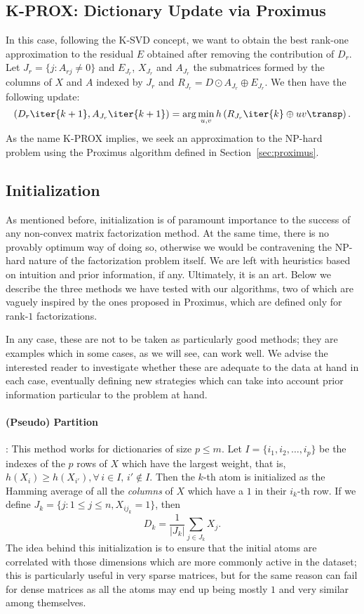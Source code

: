 \documentclass[twocolumn]{IEEEtran}
\begin{document}
\subsection{K-PROX: Dictionary Update via Proximus}

In this case, following the K-SVD concept, we want to obtain the best rank-one approximation to the residual $E$ obtained after removing the contribution of $D_r$. Let $J_r = \{j: A_{rj} \neq 0 \}$ and $E_{J_r}$, $X_{J_r}$ and $A_{J_r}$ the submatrices formed by the columns of $X$ and $A$ indexed by $J_r$ and $R_{J_r}=D{\odot}A_{J_r} \oplus E_{J_r}$. We then have the following update:
\begin{equation}
(D_r\iter{k+1},A_{J_r}\iter{k+1}) = \arg\min_{u,v} h\left( R_{J_r}\iter{k} \oplus uv\transp \right).
\label{eq:bsvd1}
\end{equation}
As the name K-PROX implies, we seek an approximation to the NP-hard problem  using the Proximus algorithm defined in Section~\ref{sec:proximus}.

\subsection{Initialization}

As mentioned before, initialization is of paramount importance to the success of any non-convex matrix factorization method. At the same time, there is no provably optimum way of doing so, otherwise we would be contravening the NP-hard nature of the factorization problem itself. We are left with heuristics based on intuition and prior information, if any. Ultimately, it is an art. Below we describe the three methods we have tested with our algorithms, two of which are vaguely inspired by the ones proposed in Proximus, which are defined only for rank-$1$ factorizations.

In any case, these are not to be taken as particularly good methods; they are examples which in some cases, as we will see, can work well. We advise the interested reader to investigate whether these are adequate to the data at hand in each case, eventually defining new strategies which can take into account prior information particular to the problem at hand. 

\paragraph{(Pseudo) Partition}: This method works for dictionaries of size $p \leq m$. Let $I=\{i_1,i_2,\ldots,i_p\}$ be the indexes of the $p$ rows of $X$ which have the largest weight, that is, $h(X_i) \geq h(X_{i'}),\forall\,i\in{I},\,i' \notin{I}$. Then the $k$-th atom is initialized as the Hamming average of all the \emph{columns} of $X$ which have a $1$ in their $i_k$-th row. If we define $J_k=\{j:1 \leq j \leq n, X_{ij_k}=1 \}$, then $$D_k = \frac{1}{|J_k|}\sum_{j \in J_k} X_j.$$ 
The idea behind this initialization is to ensure that the initial atoms are correlated with those dimensions which are more commonly active in the dataset; this is particularly useful in very sparse matrices, but for the same reason can fail for dense matrices as all the atoms may end up being mostly $1$ and very similar among themselves.
 
\end{document}
